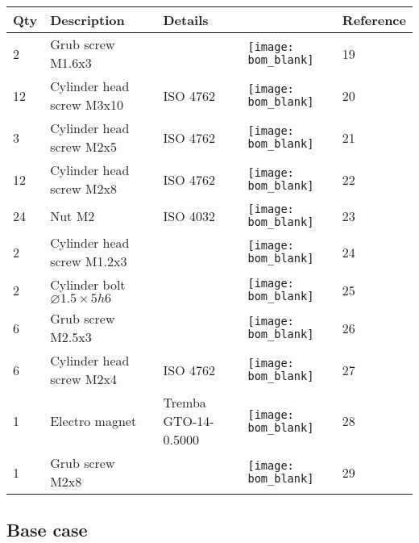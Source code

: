 \begin{tabular}{m{0.5cm} m{5cm} m{5cm} m{1cm} m{1.5cm}}
\bfseries Qty & \bfseries Description               & \bfseries Details             &                                                   & \bfseries Reference\\
\hline
2    & Grub screw M1.6x3                            &                               & \texttt{[image: bom\_blank]}           & 19    \\
\hline
12   & Cylinder head screw M3x10                    & ISO 4762                      & \texttt{[image: bom\_blank]}           & 20    \\
\hline
3    & Cylinder head screw M2x5                     & ISO 4762                      & \texttt{[image: bom\_blank]}           & 21    \\
\hline
12   & Cylinder head screw M2x8                     & ISO 4762                      & \texttt{[image: bom\_blank]}           & 22    \\
\hline
24   & Nut M2                                       & ISO 4032                      & \texttt{[image: bom\_blank]}           & 23    \\
\hline
2    & Cylinder head screw M1.2x3                   &                               & \texttt{[image: bom\_blank]}           & 24    \\
\hline
2    & Cylinder bolt $\varnothing 1.5\times5h6$     &                               & \texttt{[image: bom\_blank]}           & 25    \\
\hline
6    & Grub screw M2.5x3                            &                               & \texttt{[image: bom\_blank]}           & 26    \\
\hline
6    & Cylinder head screw M2x4                     & ISO 4762                      & \texttt{[image: bom\_blank]}           & 27    \\
\hline
1    & Electro magnet                               & Tremba GTO-14-0.5000          & \texttt{[image: bom\_blank]}           & 28    \\
\hline
1    & Grub screw M2x8                              &                               & \texttt{[image: bom\_blank]}           & 29    \\
\hline
\end{tabular}

\subsection{Base case}
\label{sec:bom-basecase}

